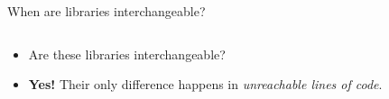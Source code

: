 \documentclass[aspectratio=169, lualatex, handout]{beamer}
\begin{document}
\begin{frame}{When are libraries interchangeable?}
	\begin{columns}[c]
		\begin{column}{0.5\textwidth}
			\begin{itemize}[<+->]
				\item Are these libraries interchangeable?
				\item \textbf{Yes!} Their only difference happens in \textit{unreachable lines of code}.
			\end{itemize}
		\end{column}
		\begin{column}{0.05\textwidth}
		\end{column}
		\begin{column}{0.45\textwidth}
		\end{column}
	\end{columns}
\end{frame}
\end{document}
